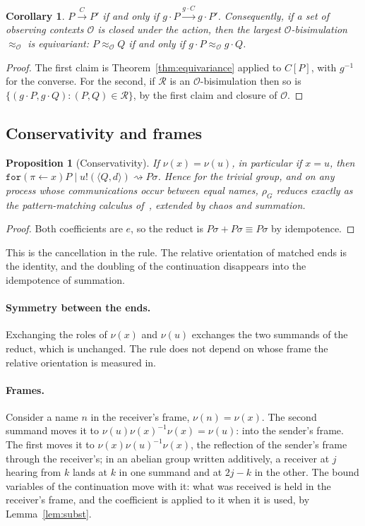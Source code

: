 \documentclass[11pt]{article}
\newtheorem{proposition}[theorem]{Proposition}
\newtheorem{corollary}[theorem]{Corollary}
\theoremstyle{definition}
\theoremstyle{remark}
\newcommand{\calc}{\rho_G}
\newcommand{\rcv}[3]{\mathtt{for}(#1 \leftarrow #2)#3}
\newcommand{\out}[3]{#1!(\langle #2, #3\rangle)}
\newcommand{\act}[2]{#1\cdot #2}
\newcommand{\red}{\rightsquigarrow}
\newcommand{\scong}{\equiv}
\begin{document}
\begin{corollary}\label{cor:labels}
$P\xrightarrow{C}P'$ if and only if
$\act{g}{P}\xrightarrow{\act{g}{C}}\act{g}{P'}$. Consequently, if a set of
observing contexts $\mathcal{O}$ is closed under the action, then the largest
$\mathcal{O}$-bisimulation $\approx_{\mathcal{O}}$ is equivariant:
$P\approx_{\mathcal{O}}Q$ if and only if
$\act{g}{P}\approx_{\mathcal{O}}\act{g}{Q}$.
\end{corollary}

\begin{proof}
The first claim is Theorem~\ref{thm:equivariance} applied to $C[P]$, with
$g^{-1}$ for the converse. For the second, if $\mathcal{R}$ is an
$\mathcal{O}$-bisimulation then so is
$\{(\act{g}{P},\act{g}{Q}) : (P,Q)\in\mathcal{R}\}$, by the first claim and
closure of $\mathcal{O}$.
\end{proof}

\subsection{Conservativity and frames}

\begin{proposition}[Conservativity]\label{prop:conservative}
If $\nu(x)=\nu(u)$, in particular if $x=u$, then
$\rcv{\pi}{x}{P}\mid\out{u}{Q}{d}\red P\sigma$. Hence for the trivial group,
and on any process whose communications occur between equal names, $\calc$
reduces exactly as the pattern-matching calculus of~\cite{wsh}, extended by
chaos and summation.
\end{proposition}

\begin{proof}
Both coefficients are $e$, so the reduct is $P\sigma+P\sigma\scong P\sigma$ by
idempotence.
\end{proof}

This is the cancellation in the rule. The relative orientation of matched ends
is the identity, and the doubling of the continuation disappears into the
idempotence of summation.

\paragraph{Symmetry between the ends.}
Exchanging the roles of $\nu(x)$ and $\nu(u)$ exchanges the two summands of the
reduct, which is unchanged. The rule does not depend on whose frame the
relative orientation is measured in.

\paragraph{Frames.}
Consider a name $n$ in the receiver's frame, $\nu(n)=\nu(x)$. The second summand
moves it to $\nu(u)\nu(x)^{-1}\nu(x)=\nu(u)$: into the sender's frame. The first
moves it to $\nu(x)\nu(u)^{-1}\nu(x)$, the reflection of the sender's frame
through the receiver's; in an abelian group written additively, a receiver at
$j$ hearing from $k$ lands at $k$ in one summand and at $2j-k$ in the other.
The bound variables of the continuation move with it: what was received is
held in the receiver's frame, and the coefficient is applied to it when it is
used, by Lemma~\ref{lem:subst}.
\end{document}
